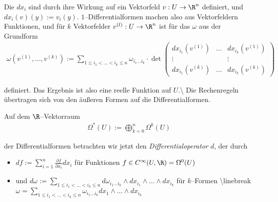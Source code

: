 \par
Die \(dx_i\) sind durch ihre Wirkung auf ein Vektorfeld \(v:U\to
\R^n\) definiert, und \(dx_i(v)( y) := v_i( y)\).
\(1\)–Differentialformen machen also aus Vektorfeldern Funktionen, und für \(k\) Vektorfelder \(v^{(l)}:U\to\R^n\) ist für das \(\omega\) aus der Grundform
\begin{align*}
\omega\left(v^{(1)},\ldots,v^{(k)}\right) := \sum_{1\leq i_1<\ldots<i_k\leq n}
\omega_{i_1\ldots i_k}\cdot\det\begin{pmatrix} dx_{i_1}(v^{(1)})&\ldots& dx_{i_k}(v^{(1)})\\
\vdots&&\vdots\\
dx_{i_1}(v^{(k)})&\ldots& dx_{i_k}(v^{(k)}) \end{pmatrix}
\end{align*}
\par
definiert. Das Ergebnis ist also eine reelle Funktion auf \(U\).\textbackslash{}
Die Rechenregeln übertragen sich von den äußeren Formen auf die Differentialformen.

\par
Auf dem \(\R\)–Vektorraum
\begin{align*}
\Omega^*(U) := \bigoplus_{k=0}^n\Omega^k(U)
\end{align*}
\par
der Differentialformen betrachten wir jetzt
den \emph{Differentialoperator} \(d\), der durch
\begin{itemize}
\item {} 
\par
\(df := \sum_{i=1}^n\frac{\partial f}{\partial x_i}dx_i\) für Funktionen
\(f\in C^\infty(U,\R) = \Omega^0(U)\)

\item {} 
\par
und \(d\omega := \sum_{1\leq i_1<\ldots<i_k\leq n}d\omega_{i_1\ldots i_k}
\wedge dx_{i_1}\wedge\ldots\wedge dx_{i_k}\) für \(k\)–Formen \textbackslash{}linebreak
\(\omega = \sum_{1\leq i_1<\ldots<i_k\leq n}\omega_{i_1\ldots i_k}
dx_1\wedge\ldots\wedge dx_{i_k}\)

\end{itemize}

